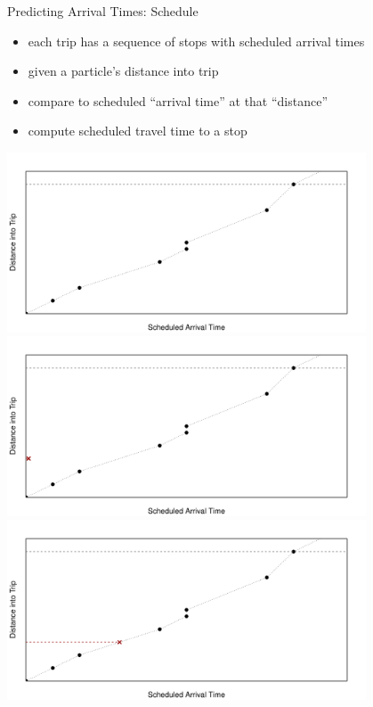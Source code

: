 \documentclass[10pt,t]{beamer}
\begin{document}
\begin{frame}{Predicting Arrival Times: Schedule}
  \onslide<+->

  \begin{itemize}[<+- | alert@+>]
  \item each trip has a sequence of stops with scheduled arrival times
  \item given a particle's distance into trip
  \item compare to scheduled ``arrival time'' at that ``distance''
  \item compute scheduled travel time to a stop
  \end{itemize}

  \begin{overprint}
    \centering
    \includegraphics[width=0.8\textwidth]{figs/pred-sched-frame1.pdf}
    \centering
    \includegraphics[width=0.8\textwidth]{figs/pred-sched-frame2.pdf}
    \centering
    \includegraphics[width=0.8\textwidth]{figs/pred-sched-frame3.pdf}

\end{overprint}
\end{frame}
\end{document}
